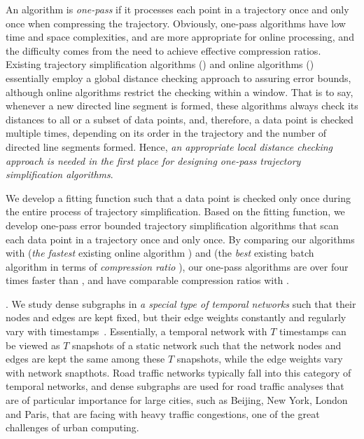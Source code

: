 An \lsa algorithm is {\em one-pass} if it processes each point in a trajectory once and only once when compressing the trajectory.
Obviously, one-pass algorithms have low time and space complexities, and are more appropriate for online processing, and
the difficulty comes from the need to achieve effective compression ratios.
Existing trajectory simplification algorithms (\eg \cite{Douglas:Peucker}) and online algorithms  (\eg \cite{Liu:BQS}) essentially employ a global distance checking approach to assuring error bounds, although online algorithms restrict the checking within a window. That is to say, whenever a new directed line segment is formed, these algorithms always check its distances to all or a subset of data points, and, therefore, a data point is checked multiple times, depending on its order in the trajectory and the number of directed line segments formed. Hence, {\em an appropriate local distance checking approach is needed in the first place for designing one-pass trajectory simplification algorithms}.

 We develop a  fitting function such that a data point is checked only once during the entire process of trajectory simplification. Based on the fitting function, we develop one-pass error bounded trajectory simplification algorithms that scan each data point in a trajectory once and only once. By comparing our algorithms with \fbqsa (\emph{the fastest} existing \lsa online algorithm \cite{Liu:BQS}) and \dpa (the {\em best} existing \lsa batch algorithm in terms of {\em compression ratio} \cite{Douglas:Peucker}), our one-pass algorithms are over four times faster than \fbqsa, and have  comparable compression ratios with \dpa.


.  We study dense subgraphs in {\em a special type of temporal networks} such that their nodes and edges are kept fixed, but their edge weights constantly and regularly vary with timestamps~\cite{MaHWLH17}.  Essentially, a temporal network with $T$ timestamps can be viewed as $T$ snapshots of a static network such that the network nodes and edges are kept the same among these $T$ snapshots, while the edge weights vary with network snapthots. Road traffic networks typically fall into this category of temporal networks, and dense subgraphs are used for road traffic analyses that are of particular importance for large cities, such as Beijing, New York, London and Paris, that are facing with heavy traffic congestions, one of the great challenges of urban computing.

